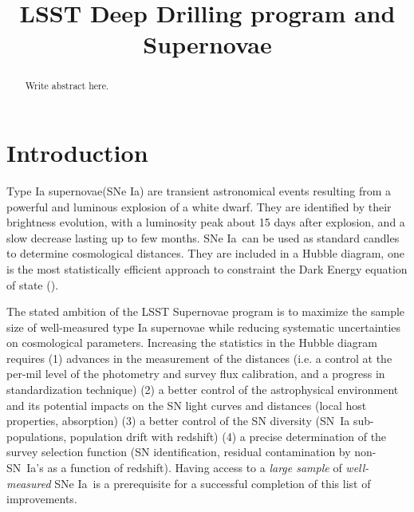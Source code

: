 \documentclass[\docopts]{\docclass}
\newcommand{\sne}{{SNe Ia}}
\begin{document}
\title{LSST Deep Drilling program and Supernovae}

\maketitlepre

\begin{abstract}

  Write abstract here.

\end{abstract}

\dockeys{}

\maketitlepost


\section{Introduction}
\label{sec:intro}
Type Ia supernovae(\sne) are transient astronomical events resulting from a powerful and luminous explosion of a white dwarf. They are identified by their brightness evolution, with a luminosity peak about 15 days after explosion, and a slow decrease lasting up to few months. \sne~can be used as standard candles to determine cosmological distances. They are included in a Hubble diagram, one is the most statistically efficient approach to constraint the Dark Energy equation of state (\citealt{Betoule_2014,Scolnic_2018}).
\par
The stated ambition of the LSST Supernovae program is to maximize the sample size of well-measured type Ia supernovae while reducing systematic uncertainties on cosmological parameters. Increasing the statistics in the Hubble diagram requires (1) advances in the measurement of the distances (i.e.  a control at the per-mil level of the photometry and survey flux calibration, and a progress in standardization technique) (2) a better control of the astrophysical environment and its potential impacts on the SN light curves and distances (local host properties, absorption) (3) a better control of the SN diversity (SN~Ia sub-populations, population drift with redshift) (4) a precise determination of the survey selection function (SN identification, residual contamination by non-SN~Ia's as a function of redshift). Having access to a {\it large sample} of {\it well-measured} \sne~is a prerequisite for a successful completion of this list of improvements.
\par
\end{document}

